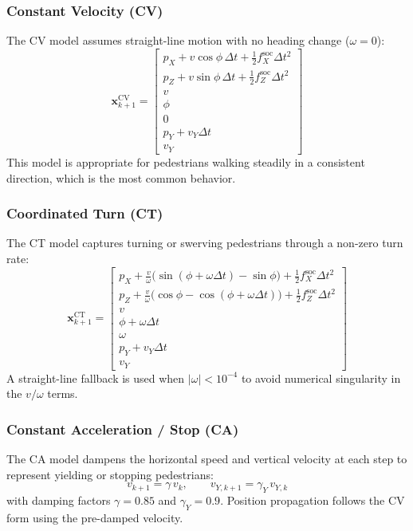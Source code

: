 \documentclass[conference]{IEEEtran}
\begin{document}
\subsubsection{Constant Velocity (CV)}
The CV model assumes straight-line motion with no heading change ($\omega = 0$):
\begin{equation}
\label{eq:cv}
\mathbf{x}_{k+1}^{\text{CV}} = \begin{bmatrix}
p_X + v \cos\phi \,\Delta t + \tfrac{1}{2}f_X^{\text{soc}}\Delta t^2 \\
p_Z + v \sin\phi \,\Delta t + \tfrac{1}{2}f_Z^{\text{soc}}\Delta t^2 \\
v \\ \phi \\ 0 \\
p_Y + v_Y \Delta t \\ v_Y
\end{bmatrix}
\end{equation}
This model is appropriate for pedestrians walking steadily in a consistent direction, which is the most common behavior.

\subsubsection{Coordinated Turn (CT)}
The CT model captures turning or swerving pedestrians through a non-zero turn rate:
\begin{equation}
\label{eq:ct}
\mathbf{x}_{k+1}^{\text{CT}} = \begin{bmatrix}
p_X + \tfrac{v}{\omega}\bigl(\sin(\phi + \omega\Delta t) - \sin\phi\bigr) + \tfrac{1}{2}f_X^{\text{soc}}\Delta t^2 \\
p_Z + \tfrac{v}{\omega}\bigl(\cos\phi - \cos(\phi + \omega\Delta t)\bigr) + \tfrac{1}{2}f_Z^{\text{soc}}\Delta t^2 \\
v \\
\phi + \omega\Delta t \\
\omega \\
p_Y + v_Y \Delta t \\ v_Y
\end{bmatrix}
\end{equation}
A straight-line fallback is used when $|\omega| < 10^{-4}$ to avoid numerical singularity in the $v/\omega$ terms.

\subsubsection{Constant Acceleration / Stop (CA)}
The CA model dampens the horizontal speed and vertical velocity at each step to represent yielding or stopping pedestrians:
\begin{equation}
\label{eq:ca}
v_{k+1} = \gamma \, v_k, \qquad v_{Y,k+1} = \gamma_Y \, v_{Y,k}
\end{equation}
with damping factors $\gamma = 0.85$ and $\gamma_Y = 0.9$. Position propagation follows the CV form using the pre-damped velocity.
\end{document}
